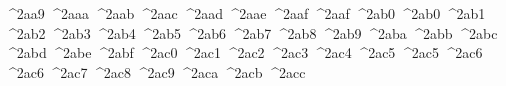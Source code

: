 {  ^^^^2aa9%
  ^^^^2aaa%
  ^^^^2aab%
  ^^^^2aac%
  ^^^^2aad%
  ^^^^2aae%
  ^^^^2aaf%
  ^^^^2aaf%
  ^^^^2ab0%
  ^^^^2ab0%
  ^^^^2ab1%
  ^^^^2ab2%
  ^^^^2ab3%
  ^^^^2ab4%
  ^^^^2ab5%
  ^^^^2ab6%
  ^^^^2ab7%
  ^^^^2ab8%
  ^^^^2ab9%
  ^^^^2aba%
  ^^^^2abb%
  ^^^^2abc%
  ^^^^2abd%
  ^^^^2abe%
  ^^^^2abf%
  ^^^^2ac0%
  ^^^^2ac1%
  ^^^^2ac2%
  ^^^^2ac3%
  ^^^^2ac4%
  ^^^^2ac5%
  ^^^^2ac5%
  ^^^^2ac6%
  ^^^^2ac6%
  ^^^^2ac7%
  ^^^^2ac8%
  ^^^^2ac9%
  ^^^^2aca%
  ^^^^2acb%
  ^^^^2acc%
}
